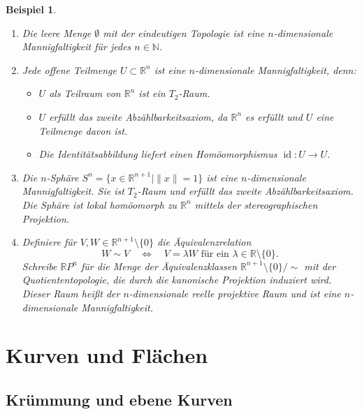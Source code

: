 \documentclass[a4paper,12pt]{article}
\theoremstyle{break}
\newtheorem{example}[definition]{Beispiel}
\begin{document}
\begin{example}
\begin{enumerate}
    Beispiele für n-dimensionale Mannigfaltigkeiten sind:
    \item Die leere Menge $\emptyset$ mit der eindeutigen Topologie ist eine $n$-dimensionale Mannigfaltigkeit für jedes $n \in \mathbb{N}$.
    
    \item Jede offene Teilmenge $U \subset \mathbb{R}^n$ ist eine $n$-dimensionale Mannigfaltigkeit, denn:
    \begin{itemize}
        \item $U$ als Teilraum von $\mathbb{R}^n$ ist ein $T_2$-Raum.
        \item $U$ erfüllt das zweite Abzählbarkeitsaxiom, da $\mathbb{R}^n$ es erfüllt und $U$ eine Teilmenge davon ist.
        \item Die Identitätsabbildung liefert einen Homöomorphismus $\operatorname{id}: U \to U$.
    \end{itemize}

    \item Die $n$-Sphäre $S^n = \{x \in \mathbb{R}^{n+1} \mid \|x\| = 1\}$ ist eine $n$-dimensionale Mannigfaltigkeit. Sie ist $T_2$-Raum und erfüllt das zweite Abzählbarkeitsaxiom. Die Sphäre ist lokal homöomorph zu $\mathbb{R}^n$ mittels der \emph{stereographischen Projektion}.
    
    \item Definiere für $V, W \in \mathbb{R}^{n+1} \setminus \{0\}$ die Äquivalenzrelation
    \[
    W \sim V \quad \iff \quad V = \lambda W \text{ für ein } \lambda \in \mathbb{R} \setminus \{0\}.
    \]
    Schreibe $\mathbb{R}P^n$ für die Menge der Äquivalenzklassen $\mathbb{R}^{n+1} \setminus \{0\} / \sim$ mit der Quotiententopologie, die durch die kanonische Projektion induziert wird. Dieser Raum heißt der \emph{$n$-dimensionale reelle projektive Raum} und ist eine $n$-dimensionale Mannigfaltigkeit.
\end{enumerate}
\end{example}

\section{Kurven und Flächen}
\subsection{Krümmung und ebene Kurven}
\end{document}
